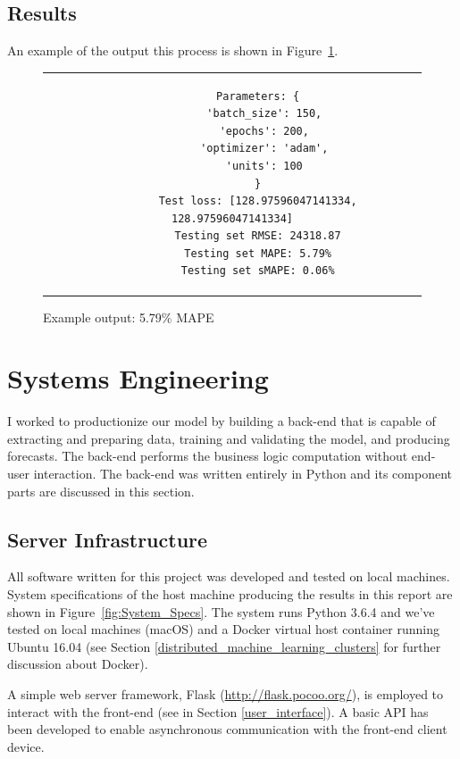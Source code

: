 \documentclass[11pt, oneside]{article}
\begin{document}
\subsection{Results}
An example of the output this process is shown in Figure~\ref{fig:Example_Output}.

\begin{figure}[h]
  \caption{Example output: 5.79\% MAPE}
  \label{fig:Example_Output}
  \begin{center}
    \begin{tabular}{c}
      \begin{lstlisting}
        Parameters: {
          'batch_size': 150,
          'epochs': 200,
          'optimizer': 'adam',
          'units': 100
        }
        Test loss: [128.97596047141334, 128.97596047141334]
        Testing set RMSE: 24318.87
        Testing set MAPE: 5.79%
        Testing set sMAPE: 0.06%
      \end{lstlisting}
    \end{tabular}
  \end{center}
\end{figure}

\section{Systems Engineering}
I worked to productionize our model by building a back-end that is capable of extracting and preparing data, training and validating the model, and producing forecasts. The back-end performs the business logic computation without end-user interaction. The back-end was written entirely in Python and its component parts are discussed in this section.

\subsection{Server Infrastructure}
All software written for this project was developed and tested on local machines. System specifications of the host machine producing the results in this report are shown in Figure~\ref{fig:System_Specs}. The system runs Python 3.6.4 and we've tested on local machines (macOS) and a Docker virtual host container running Ubuntu 16.04 (see Section \ref{distributed_machine_learning_clusters} for further discussion about Docker).

A simple web server framework, Flask (\url{http://flask.pocoo.org/}), is employed to interact with the front-end (see in Section \ref{user_interface}). A basic API has been developed to enable asynchronous communication with the front-end client device.
\end{document}

